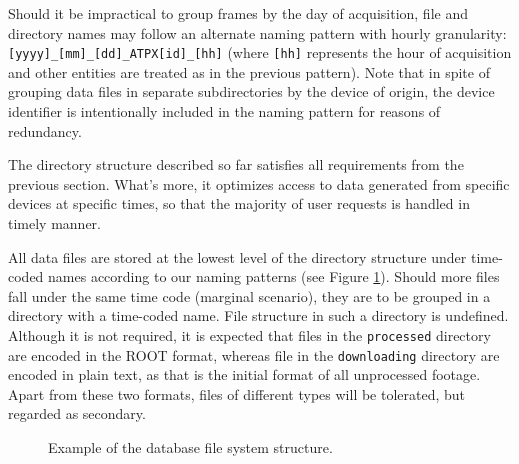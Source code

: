 Should it be impractical to group frames by the day of acquisition, file and directory names may follow an alternate naming pattern with hourly granularity: \texttt{[yyyy]\_[mm]\_[dd]\_ATPX[id]\_[hh]} (where \texttt{[hh]} represents the hour of acquisition and other entities are treated as in the previous pattern). Note that in spite of grouping data files in separate subdirectories by the device of origin, the device identifier is intentionally included in the naming pattern for reasons of redundancy.

The directory structure described so far satisfies all requirements from the previous section. What's more, it optimizes access to data generated from specific devices at specific times, so that the majority of user requests is handled in timely manner.

All data files are stored at the lowest level of the directory structure under time-coded names according to our naming patterns (see Figure \ref{fig:db-structure}). Should more files fall under the same time code (marginal scenario), they are to be grouped in a directory with a time-coded name. File structure in such a directory is undefined. Although it is not required, it is expected that files in the \texttt{processed} directory are encoded in the ROOT format, whereas file in the \texttt{downloading} directory are encoded in plain text, as that is the initial format of all unprocessed footage. Apart from these two formats, files of different types will be tolerated, but regarded as secondary.

\begin{figure}[t]
\begin{center}


\caption{Example of the database file system structure.}
\label{fig:db-structure}
\end{center}
\end{figure}

